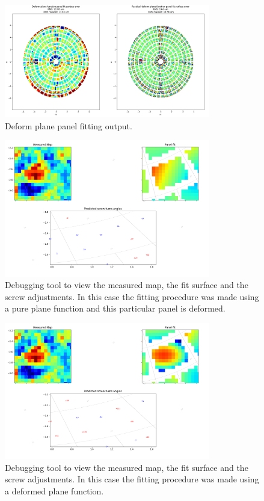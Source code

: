 \begin{figure}
    \centering
    \includegraphics[width=0.8\textwidth]{images/deform_plane_panel_fit.png}
    \caption{Deform plane panel fitting output.}
    \label{fig:deform_panel_fit}
\end{figure}


\begin{figure}
    \centering
    \includegraphics[width=0.8\textwidth]{images/plane_example.png}
    \caption{Debugging tool to view the measured map, the fit surface and the screw adjustments. In this case the fitting procedure was made using a pure plane function and this particular panel is deformed.}
    \label{fig:plane_example}
\end{figure}

\begin{figure}
    \centering
    \includegraphics[width=0.8\textwidth]{images/deform_example.png}
    \caption{Debugging tool to view the measured map, the fit surface and the screw adjustments. In this case the fitting procedure was made using a deformed plane function.}
    \label{fig:deform_example}
\end{figure}








